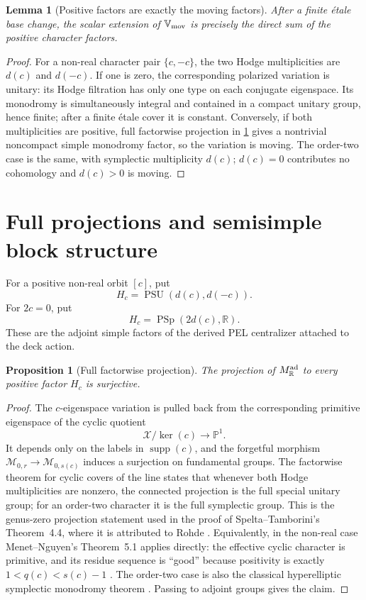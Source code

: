 \documentclass[11pt]{article}
\newtheorem{proposition}[theorem]{Proposition}
\newtheorem{lemma}[theorem]{Lemma}
\theoremstyle{definition}
\theoremstyle{remark}
\newcommand{\R}{\mathbb R}
\newcommand{\PP}{\mathbb P}
\newcommand{\M}{\mathcal M}
\newcommand{\supp}{\operatorname{supp}}
\newcommand{\PSp}{\operatorname{PSp}}
\newcommand{\PSU}{\operatorname{PSU}}
\begin{document}
\begin{lemma}[Positive factors are exactly the moving factors]\label{lem:positive-moving}
After a finite \'etale base change, the scalar extension of $\mathbb V_{\rm mov}$ is precisely the direct sum of the positive character factors.
\end{lemma}

\begin{proof}
For a non-real character pair $\{c,-c\}$, the two Hodge multiplicities are $d(c)$ and $d(-c)$.  If one is zero, the corresponding polarized variation is unitary: its Hodge filtration has only one type on each conjugate eigenspace.  Its monodromy is simultaneously integral and contained in a compact unitary group, hence finite; after a finite \'etale cover it is constant.  Conversely, if both multiplicities are positive, full factorwise projection in \cref{prop:full-projection} gives a nontrivial noncompact simple monodromy factor, so the variation is moving.  The order-two case is the same, with symplectic multiplicity $d(c)$; $d(c)=0$ contributes no cohomology and $d(c)>0$ is moving.
\end{proof}

\section{Full projections and semisimple block structure}

For a positive non-real orbit $[c]$, put
\[
 H_c=\PSU(d(c),d(-c)).
\]
For $2c=0$, put
\[
 H_c=\PSp(2d(c),\R).
\]
These are the adjoint simple factors of the derived PEL centralizer attached to the deck action.

\begin{proposition}[Full factorwise projection]\label{prop:full-projection}
The projection of $M^{\rm ad}_{\R}$ to every positive factor $H_c$ is surjective.
\end{proposition}

\begin{proof}
The $c$-eigenspace variation is pulled back from the corresponding primitive eigenspace of the cyclic quotient
\[
 \mathcal X/\ker(c)\longrightarrow\PP^1.
\]
It depends only on the labels in $\supp(c)$, and the forgetful morphism
$\M_{0,r}\to\M_{0,s(c)}$ induces a surjection on fundamental groups.  The factorwise theorem for cyclic covers of the line states that whenever both Hodge multiplicities are nonzero, the connected projection is the full special unitary group; for an order-two character it is the full symplectic group.  This is the genus-zero projection statement used in the proof of Spelta--Tamborini's Theorem~4.4, where it is attributed to Rohde \cite{Rohde,ST}.  Equivalently, in the non-real case Menet--Nguyen's Theorem~5.1 applies directly: the effective cyclic character is primitive, and its residue sequence is ``good'' because positivity is exactly
$1<q(c)<s(c)-1$ \cite{MN}.  The order-two case is also the classical hyperelliptic symplectic monodromy theorem \cite{ACampo}.  Passing to adjoint groups gives the claim.
\end{proof}
\end{document}
